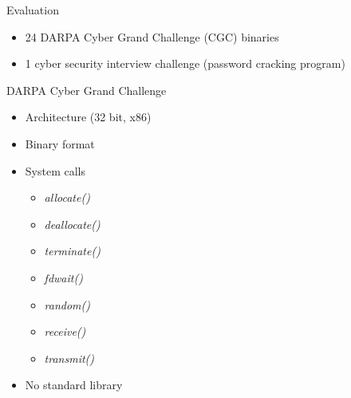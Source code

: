 \documentclass[pdf]{beamer}
\begin{document}
\begin{frame}{Evaluation}
\begin{itemize}
\item 24 DARPA Cyber Grand Challenge (CGC) binaries
\item 1 cyber security interview challenge (password cracking program) 
\end{itemize}
\end{frame}

\begin{frame}{DARPA Cyber Grand Challenge}
\begin{itemize}
\item Architecture (32 bit, x86)
\item Binary format
\item System calls
	\begin{itemize}
	\item \textit{allocate()}
	\item \textit{deallocate()}
	\item \textit{terminate()}
	\item \textit{fdwait()}
	\item \textit{random()}
	\item \textit{receive()}
	\item \textit{transmit()}
	\end{itemize}
\item No standard library
\end{itemize}
\end{frame}
\end{document}
